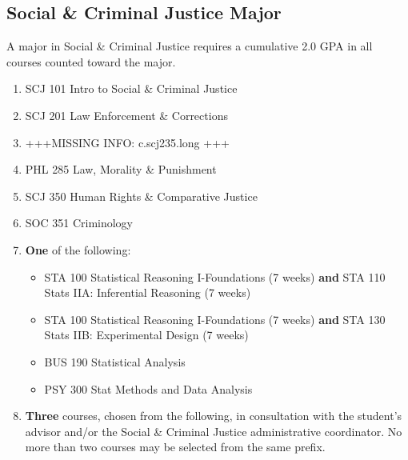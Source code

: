\documentclass[
  letterpaper,
]{scrbook}
\providecommand{\tightlist}{%
  \setlength{\itemsep}{0pt}\setlength{\parskip}{0pt}}
\begin{document}
\subsection{Social \& Criminal Justice
Major}\label{social-criminal-justice-major}

A major in Social \& Criminal Justice requires a cumulative 2.0 GPA in
all courses counted toward the major.

\begin{enumerate}
\def\labelenumi{\arabic{enumi}.}
\item
  SCJ 101 Intro to Social \& Criminal Justice
\item
  SCJ 201 Law Enforcement \& Corrections
\item
  +++MISSING INFO: c.scj235.long +++
\item
  PHL 285 Law, Morality \& Punishment
\item
  SCJ 350 Human Rights \& Comparative Justice
\item
  SOC 351 Criminology
\item
  \textbf{One} of the following:

  \begin{itemize}
  \tightlist
  \item
    STA 100 Statistical Reasoning I-Foundations (7 weeks) \textbf{and}
    STA 110 Stats IIA: Inferential Reasoning (7 weeks)
  \item
    STA 100 Statistical Reasoning I-Foundations (7 weeks) \textbf{and}
    STA 130 Stats IIB: Experimental Design (7 weeks)
  \item
    BUS 190 Statistical Analysis
  \item
    PSY 300 Stat Methods and Data Analysis
  \end{itemize}
\item
  \textbf{Three} courses, chosen from the following, in consultation
  with the student's advisor and/or the Social \& Criminal Justice
  administrative coordinator. No more than two courses may be selected
  from the same prefix.


\end{enumerate}
\end{document}
